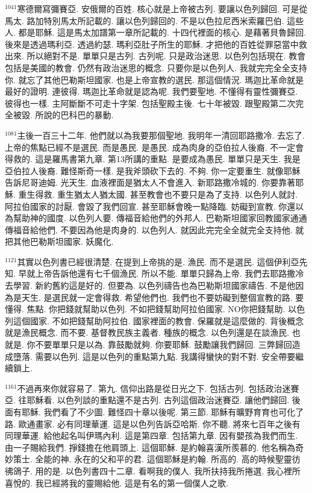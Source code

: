 \documentclass{book}
\begin{document}
$^{1041}$寒德爾寫彌賽亞.
安俄爾的百姓.
核心就是上帝被古列.
要讓以色列歸回.
可是從馬太.
路加特別馬太所記載的.
讓以色列歸回的.
不是以色拉尼西米索羅巴伯.
這些人.
都是耶穌.
這是馬太加譜第一章所記載的.
十四代裡面的核心.
是藉著貝魯歸回.
後來是透過瑪利亞.
透過約瑟.
瑪利亞肚子所生的耶穌.
才把他的百姓從罪惡當中救出來.
所以絕對不是.
單單只是古列.
古列呢.
只是政治迷思.
以色列包括現在.
教會包括是美國的教會.
仍然有政治迷思的概念.
只要你是以色列人.
我就完完全全支持你.
就忘了其他巴勒斯坦國家.
也是上帝宣教的選民.
那這個情況.
瑪迦比革命就是最好的證明.
連彼得.
瑪迦比革命就是認為呢.
我們要聖地.
不懂得有靈性彌賽亞.
彼得也一樣.
主阿斷斷不可走十字架.
包括聖殿主後.
七十年被毀.
跟聖殿第二次完全被毀.
所說的巴科巴的暴動.

$^{1081}$主後一百三十二年.
他們就以為我要那個聖地.
我明年一清回耶路撒冷.
去忘了.
上帝的焦點已經不是選民.
而是愚民.
是愚民.
成為肉身的亞伯拉人後裔.
不一定會得救的.
這是羅馬書第九章.
第13所講的重點.
是要成為愚民.
單單只是天生.
我是亞伯拉人後裔.
難怪斯奇一樣.
是我斧頭砍下去的.
不夠.
你一定要重生.
就像耶穌告訴尼哥迪姆.
光天生.
血液裡面是猶太人不會進入.
新耶路撒冷城的.
你要靠著耶穌.
重生得救.
重生猶太人猶太國.
甚至教會也不要只是為了支持.
以色列人就討.
阿拉伯國家的討厭.
會毀了我們回宣.
甚至耶穌會晚一點降臨.
妨礙到宣教.
你還以為幫助神的國度.
以色列人要.
傳福音給他們的外邦人.
巴勒斯坦國家回教國家通通傳福音給他們.
不要因為他是肉身的.
以色列人.
就因此完完全全就完全支持他.
就把其他巴勒斯坦國家.
妖魔化.

$^{1121}$其實以色列書已經很清楚.
在提到上帝挑的是.
漁民.
而不是選民.
這個伊利亞先知.
早就上帝告訴他還有七千個漁民.
所以不能.
單單只歸為上帝.
我們去耶路撒冷去學習.
新約舊約這是好的.
但要為.
以色列禱告也為巴勒斯坦國家禱告.
不是他因為是天生.
是選民就一定會得救.
希望他們也.
我們也不要妨礙到整個宣教的路.
要懂得.
焦點.
你把錢就幫助以色列.
不如把錢幫助阿拉伯國家.
NO你把錢幫助.
以色列這個國家.
不如把錢幫助阿拉伯.
國家裡面的教會.
保羅就是這麼做的.
背後概念就是漁民概念.
而不要.
基督教民族主義者.
種族的概念.
以色列還是在談漁民.
也就是.
你不要單單只是以為.
靠鼓勵就夠.
你要耶穌.
鼓勵讓我們歸回.
三弊歸回造成墮落.
需要以色列.
這是以色列的重點第九點.
我講得蠻快的對不對.
安全帶要繼續鎖上.

$^{1161}$不過再來你就容易了.
第九.
信仰出路是從日光之下.
包括古列.
包括政治迷賽亞.
往耶穌看.
以色列談的重點還不是古列.
古列這個政治迷賽亞.
讓他們歸回.
後面有耶穌.
我們看了不少圖.
難怪四十章以後呢.
第三節.
耶穌有曠野育育也可化了路.
歐通畫家.
必有同理華運.
這是以色列告訴亞哈斯.
你不聽.
將來七百年之後有同理華運.
給他起名叫伊瑪內利.
這是第四章.
包括第九章.
因有嬰孩為我們而生.
由一子賜給我們.
掙錢擔在他肩頭上.
這個耶穌.
是約翰喜漢所羨慕的.
他名稱為奇妙策士.
全能的神.
永在的父和平的君.
這個耶穌是約翰.
所高的.
高的時候聖靈彷彿鴿子.
用的是.
以色列書四十二章.
看啊我的僕人.
我所扶持我所捲選.
我心裡所喜悅的.
我已經將我的靈賜給他.
這是有名的第一個僕人之歌.
\end{document}
